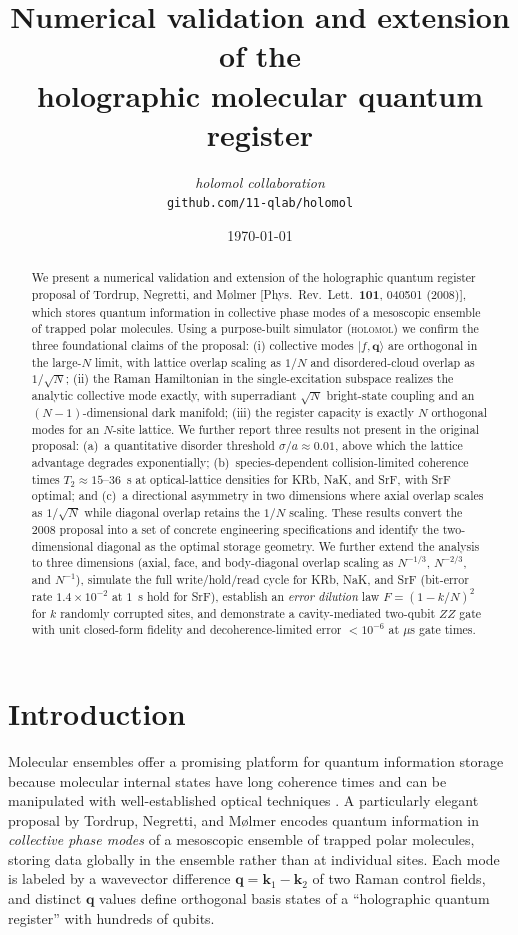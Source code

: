 \documentclass[11pt]{article}
\title{\bfseries Numerical validation and extension of the\\
holographic molecular quantum register}
\author{%
  \textit{holomol collaboration}\\
  \small \texttt{github.com/11-qlab/holomol}
}
\date{\today}
\begin{document}
\maketitle

\begin{abstract}
We present a numerical validation and extension of the holographic quantum
register proposal of Tordrup, Negretti, and M\o lmer [Phys.\ Rev.\ Lett.\
\textbf{101}, 040501 (2008)], which stores quantum information in
collective phase modes of a mesoscopic ensemble of trapped polar molecules.
Using a purpose-built simulator (\textsc{holomol}) we confirm the three
foundational claims of the proposal: (i) collective modes $|f,\mathbf q\rangle$
are orthogonal in the large-$N$ limit, with lattice overlap scaling as
$1/N$ and disordered-cloud overlap as $1/\sqrt N$; (ii) the Raman
Hamiltonian in the single-excitation subspace realizes the analytic
collective mode exactly, with superradiant $\sqrt N$ bright-state coupling
and an $(N-1)$-dimensional dark manifold; (iii) the register capacity is
exactly $N$ orthogonal modes for an $N$-site lattice. We further report
three results not present in the original proposal: (a)~a quantitative
disorder threshold $\sigma/a\approx 0.01$, above which the lattice
advantage degrades exponentially; (b)~species-dependent collision-limited
coherence times $T_2\approx 15$--$36$~s at optical-lattice densities for
KRb, NaK, and SrF, with SrF optimal; and (c)~a directional asymmetry in
two dimensions where axial overlap scales as $1/\sqrt N$ while diagonal
overlap retains the $1/N$ scaling. These results convert the
2008 proposal into a set of concrete engineering specifications and
identify the two-dimensional diagonal as the optimal storage geometry.
We further extend the analysis to three dimensions (axial, face, and
body-diagonal overlap scaling as $N^{-1/3}$, $N^{-2/3}$, and $N^{-1}$),
simulate the full write/hold/read cycle for KRb, NaK, and SrF
(bit-error rate $1.4\times 10^{-2}$ at $1$~s hold for SrF), establish
an \emph{error dilution} law $F = (1-k/N)^2$ for $k$ randomly
corrupted sites, and demonstrate a cavity-mediated two-qubit $ZZ$ gate
with unit closed-form fidelity and decoherence-limited error
$<10^{-6}$ at $\mu$s gate times.
\end{abstract}

\section{Introduction}

Molecular ensembles offer a promising platform for quantum information
storage because molecular internal states have long coherence times and
can be manipulated with well-established optical techniques
\cite{ni2008, park2015, bialyte2014}. A particularly elegant proposal by
Tordrup, Negretti, and M\o lmer \cite{tordrup2008} encodes quantum
information in \emph{collective phase modes} of a mesoscopic ensemble of
trapped polar molecules, storing data globally in the ensemble rather
than at individual sites. Each mode is labeled by a wavevector difference
$\mathbf q = \mathbf k_1 - \mathbf k_2$ of two Raman control fields, and
distinct $\mathbf q$ values define orthogonal basis states of a
``holographic quantum register'' with hundreds of qubits.
\end{document}
